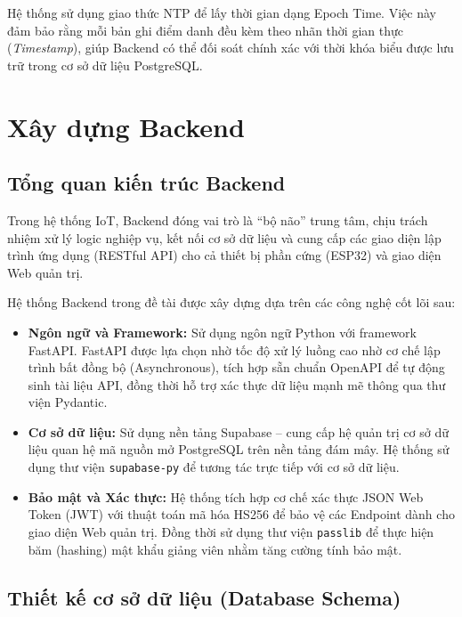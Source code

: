 \documentclass[12pt,a4paper]{report}
\begin{document}
Hệ thống sử dụng giao thức NTP để lấy thời gian dạng Epoch Time. Việc này đảm bảo rằng mỗi bản ghi điểm danh đều kèm theo nhãn thời gian thực (\textit{Timestamp}), giúp Backend có thể đối soát chính xác với thời khóa biểu được lưu trữ trong cơ sở dữ liệu PostgreSQL.

\section{Xây dựng Backend}

\subsection{Tổng quan kiến trúc Backend}

Trong hệ thống IoT, Backend đóng vai trò là ``bộ não'' trung tâm, chịu trách nhiệm xử lý logic nghiệp vụ, kết nối cơ sở dữ liệu và cung cấp các giao diện lập trình ứng dụng (RESTful API) cho cả thiết bị phần cứng (ESP32) và giao diện Web quản trị.

Hệ thống Backend trong đề tài được xây dựng dựa trên các công nghệ cốt lõi sau:

\begin{itemize}
\item \textbf{Ngôn ngữ và Framework:}  
Sử dụng ngôn ngữ Python với framework FastAPI. FastAPI được lựa chọn nhờ tốc độ xử lý luồng cao nhờ cơ chế lập trình bất đồng bộ (Asynchronous), tích hợp sẵn chuẩn OpenAPI để tự động sinh tài liệu API, đồng thời hỗ trợ xác thực dữ liệu mạnh mẽ thông qua thư viện Pydantic.

\item \textbf{Cơ sở dữ liệu:}  
Sử dụng nền tảng Supabase -- cung cấp hệ quản trị cơ sở dữ liệu quan hệ mã nguồn mở PostgreSQL trên nền tảng đám mây. Hệ thống sử dụng thư viện \texttt{supabase-py} để tương tác trực tiếp với cơ sở dữ liệu.

\item \textbf{Bảo mật và Xác thực:}  
Hệ thống tích hợp cơ chế xác thực JSON Web Token (JWT) với thuật toán mã hóa HS256 để bảo vệ các Endpoint dành cho giao diện Web quản trị. Đồng thời sử dụng thư viện \texttt{passlib} để thực hiện băm (hashing) mật khẩu giảng viên nhằm tăng cường tính bảo mật.
\end{itemize}

\subsection{Thiết kế cơ sở dữ liệu (Database Schema)}
\end{document}
